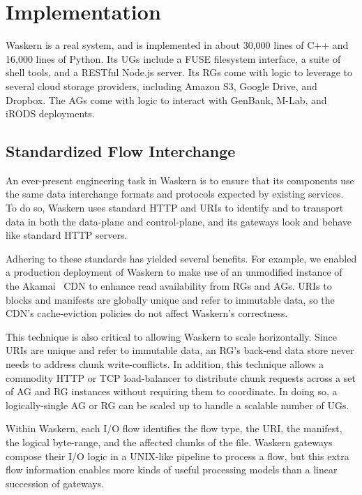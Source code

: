 \section{Implementation}
\label{sec:implementation}

Waskern is a real system, and is implemented in about 30,000 lines of C++ and
16,000 lines of Python. Its UGs include a FUSE filesystem interface, a suite of
shell tools, and a RESTful Node.js server. Its RGs come with logic to leverage
to several cloud storage providers, including Amazon S3, Google Drive, and
Dropbox. The AGs come with logic to interact with GenBank, M-Lab, and iRODS
deployments.

\subsection{Standardized Flow Interchange}

An ever-present engineering task in Waskern is to ensure that its components use
the same data interchange formats and protocols expected by existing services.
To do so, Waskern uses standard HTTP and URIs to identify and to transport data in both
the data-plane and control-plane, and its gateways look and behave like standard
HTTP servers.

Adhering to these standards has yielded several benefits.  For example,
we enabled a production deployment of Waskern to make
use of an unmodified instance of the Akamai~\cite{akamai} CDN to enhance read
availability from RGs and AGs.  URIs to blocks and manifests are
globally unique and refer to immutable data, so the CDN's cache-eviction
policies do not affect Waskern's correctness.

This technique is also critical to allowing Waskern to scale horizontally.
Since URIs are unique and refer to immutable data,
an RG's back-end data store never needs to address chunk write-conflicts.
In addition, this technique allows a commodity HTTP or TCP load-balancer to distribute
chunk requests across a set of AG and RG instances without requiring them to
coordinate.  In doing so, a logically-single AG or RG can be scaled up to handle
a scalable number of UGs.

Within Waskern, each I/O flow identifies the flow type, the URI, the manifest, the
logical byte-range, and the affected chunks of the file.  Waskern gateways compose
their I/O logic in a UNIX-like pipeline to process a flow, but this
extra flow information enables more kinds of useful processing models than a linear
succession of gateways.

